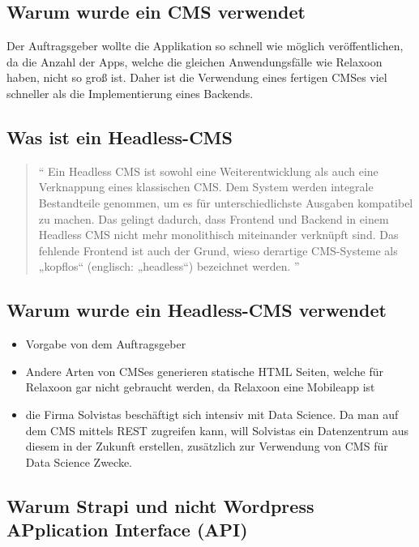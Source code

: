 \begin{spacing}{1}
    \subsection{Warum wurde ein CMS verwendet}
    Der Auftragsgeber wollte die Applikation so schnell wie möglich veröffentlichen,
    da die Anzahl der Apps, welche die gleichen Anwendungsfälle wie Relaxoon haben,
    nicht so groß ist.
    Daher ist die Verwendung eines fertigen CMSes viel schneller als
    die Implementierung eines Backends.

    \subsection{Was ist ein Headless-CMS}
    \begin{quotation}

        ``
        Ein Headless CMS ist sowohl eine Weiterentwicklung als
        auch eine Verknappung eines klassischen CMS. Dem System
        werden integrale Bestandteile genommen, um es für
        unterschiedlichste Ausgaben kompatibel zu machen.
        Das gelingt dadurch, dass Frontend und Backend in einem
        Headless CMS nicht mehr monolithisch miteinander verknüpft
        sind. Das fehlende Frontend ist auch der Grund,
        wieso derartige CMS-Systeme als
        „kopflos“ (englisch: „headless“) bezeichnet werden.
        '' \cite{headles-cms}
    \end{quotation}

    \subsection{Warum wurde ein Headless-CMS verwendet}
    \begin{itemize}
        \item Vorgabe von dem Auftragsgeber
        \item Andere Arten von CMSes generieren statische HTML Seiten, welche für Relaxoon gar nicht gebraucht werden,
              da Relaxoon eine Mobileapp ist
        \item die Firma Solvistas beschäftigt sich intensiv mit Data Science. Da man auf dem CMS mittels REST zugreifen kann,
              will Solvistas ein Datenzentrum aus diesem in der Zukunft erstellen, zusätzlich zur Verwendung von CMS für Data Science Zwecke.
    \end{itemize}
    \subsection{Warum Strapi und nicht Wordpress \textbf{AP}plication \textbf{I}nterface (API)}




\end{spacing}
